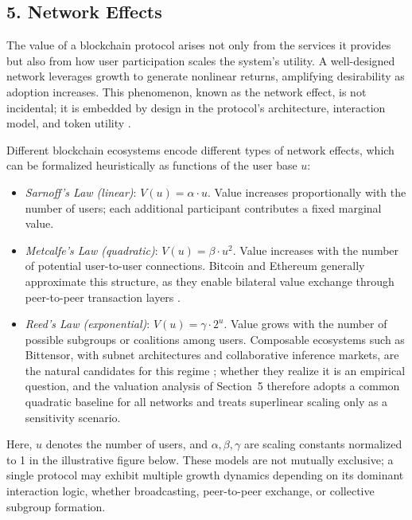 \documentclass[12pt]{article}
\begin{document}
\subsection*{5. Network Effects}

The value of a blockchain protocol arises not only from the services it provides but also from how user participation scales the system’s utility. A well-designed network leverages growth to generate nonlinear returns, amplifying desirability as adoption increases. This phenomenon, known as the network effect, is not incidental; it is embedded by design in the protocol’s architecture, interaction model, and token utility \citep{gans2019economics, huberman2021monetizing, catalini2020some}.

Different blockchain ecosystems encode different types of network effects, which can be formalized heuristically as functions of the user base \( u \):

\begin{itemize}
    \item \textit{Sarnoff's Law (linear)}: \( V(u) = \alpha \cdot u \). Value increases proportionally with the number of users; each additional participant contributes a fixed marginal value.

    \item \textit{Metcalfe's Law (quadratic)}: \( V(u) = \beta \cdot u^2 \). Value increases with the number of potential user-to-user connections. Bitcoin and Ethereum generally approximate this structure, as they enable bilateral value exchange through peer-to-peer transaction layers \citep{gans2019economics, huberman2021monetizing}.

    \item \textit{Reed's Law (exponential)}: \( V(u) = \gamma \cdot 2^u \). Value grows with the number of possible subgroups or coalitions among users. Composable ecosystems such as Bittensor, with subnet architectures and collaborative inference markets, are the natural candidates for this regime \citep{rao2023bittensor, gregory2025token}; whether they realize it is an empirical question, and the valuation analysis of Section~5 therefore adopts a common quadratic baseline for all networks and treats superlinear scaling only as a sensitivity scenario.
\end{itemize}


Here, \( u \) denotes the number of users, and \( \alpha, \beta, \gamma \) are scaling constants normalized to 1 in the illustrative figure below. These models are not mutually exclusive; a single protocol may exhibit multiple growth dynamics depending on its dominant interaction logic, whether broadcasting, peer-to-peer exchange, or collective subgroup formation.
\end{document}
